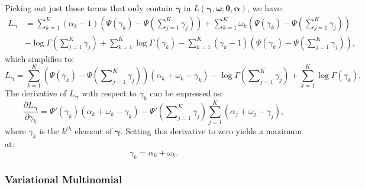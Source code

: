 \documentclass{article}
\begin{document}
Picking out just those terms that only contain $\bm{\gamma}$ in $L\left(\bm{\gamma},\bm{\omega};\bm{\theta},\bm{\alpha}\right)$, we have:
\begin{align}
\label{eq:Appendix15}
L_{\bm{\gamma}}
&=
\sum_{k=1}^K
\left( \alpha_k-1 \right)
\left( \Psi\left(\gamma_k\right)-\Psi\left(\sum\nolimits_{j=1}^K\gamma_j\right) \right)
+\sum_{k=1}^K
\omega_k
\left(\Psi \left( \gamma_k \right)-\Psi \left( \sum\nolimits_{j=1}^K \gamma_j \right) \right) \nonumber \\
&-\log \Gamma \left( \sum\nolimits_{j=1}^K\gamma_j\right)
+\sum_{k=1}^K\log \Gamma \left( \gamma_k \right)
-\sum\nolimits_{k=1}^K
\left( \gamma_k-1 \right)
\left( \Psi\left( \gamma_k \right) -\Psi \left( \sum\nolimits_{j=1}^K \gamma_j\right) \right),
\end{align}
\noindent which simplifies to:
\begin{equation}
\label{eq:Appendix16}
L_{\bm{\gamma}}
=
\sum_{k=1}^K
\left( \Psi\left( \gamma_k \right) -\Psi \left( \sum\nolimits_{j=1}^K \gamma_j\right) \right)
\left( \alpha_k + \omega_k - \gamma_k \right)
-\log \Gamma \left( \sum\nolimits_{j=1}^K\gamma_j\right)
+\sum_{k=1}^K\log \Gamma \left( \gamma_k \right).
\end{equation}
\noindent The derivative of $L_{\bm{\gamma}}$ with respect to $\gamma_k$ can be expressed as:
\begin{equation}
\label{eq:Appendix17}
\frac{\partial L_{\bm{\gamma}}}
{\partial{\gamma_k}}
=
\Psi'\left( \gamma_k \right)
\left( \alpha_k + \omega_k - \gamma_k \right)
- \Psi'\left( \sum\nolimits_{j=1}^K \gamma_j \right)
\sum_{j=1}^K \left(\alpha_j + \omega_j - \gamma_j \right),
\end{equation}
where $\gamma_k$ is the $k^{th}$ element of $\bm{\gamma}$. Setting this derivative to zero yields a maximum at:
\begin{equation}
\label{eq:Appendix18}
\gamma_k
=
\alpha_k
+
\omega_k.
\end{equation}



\subsubsection{Variational Multinomial}
\label{App:VaMultinomial}
\end{document}
